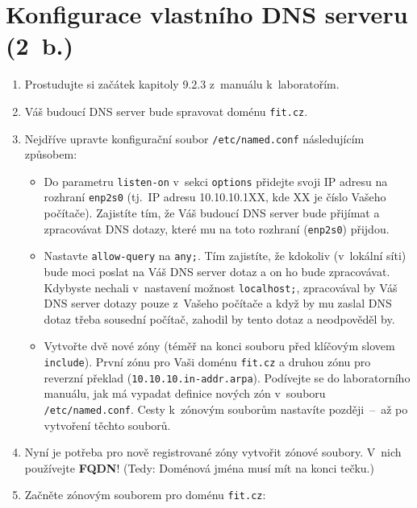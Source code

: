 \section{Konfigurace vlastního DNS serveru \textbf{(2~b.)}}
\begin{enumerate}
  \item Prostudujte si začátek kapitoly 9.2.3 z~manuálu k~laboratořím.
  \item Váš budoucí DNS server bude spravovat doménu  {\tt fit.cz}.
  \item Nejdříve upravte konfigurační soubor {\tt /etc/named.conf} následujícím způsobem:
    \begin{itemize}
      \item Do parametru {\tt listen-on} v~sekci {\tt options} přidejte svoji IP adresu na rozhraní {\tt enp2s0}
            (tj.~IP adresu 10.10.10.1XX, kde XX je číslo Vašeho počítače).
            Zajistíte tím, že Váš budoucí DNS server bude přijímat a zpracovávat DNS dotazy, které mu na toto rozhraní ({\tt enp2s0}) přijdou. 
      \item Nastavte {\tt allow-query} na {\tt any;}.
            Tím zajistíte, že kdokoliv (v~lokální síti) bude moci poslat na Váš DNS server dotaz a on ho bude zpracovávat.
            Kdybyste nechali v~nastavení možnost {\tt localhost;}, zpracovával by Váš DNS server dotazy pouze z~Vašeho počítače a
            když by mu zaslal DNS dotaz třeba sousední počítač, zahodil by tento dotaz a neodpověděl by.
      \item Vytvořte dvě nové zóny (téměř na konci souboru před klíčovým slovem {\tt include}). První zónu pro Vaši doménu {\tt fit.cz} a druhou zónu pro reverzní překlad ({\tt 10.10.10.in-addr.arpa}).
            Podívejte se do laboratorního manuálu, jak má vypadat definice nových zón v~souboru {\tt /etc/named.conf}.
            Cesty k~zónovým souborům nastavíte později~--~až po vytvoření těchto souborů.
    \end{itemize}
  
  \item Nyní je potřeba pro nově registrované zóny vytvořit zónové soubory. V~nich používejte \textbf{FQDN}! (Tedy: Doménová jména musí mít na konci tečku.)
  \item Začněte zónovým souborem pro doménu {\tt fit.cz}:
  

\end{enumerate}
